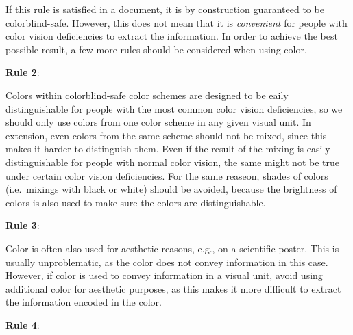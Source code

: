 \documentclass{scrartcl}
\begin{document}
If this rule is satisfied in a document, it is by construction guaranteed to be colorblind-safe.
However, this does not mean that it is \emph{convenient} for people with color vision deficiencies to extract the information.
In order to achieve the best possible result, a few more rules should be considered when using color.
\begin{center}
    \setlength{\fboxrule}{1pt}
    \textbf{Rule 2}:
\end{center}

Colors within colorblind-safe color schemes are designed to be eaily distinguishable for people with the most common color vision deficiencies, so we should only use colors from one color scheme in any given visual unit.
In extension, even colors from the same scheme should not be mixed, since this makes it harder to distinguish them.
Even if the result of the mixing is easily distinguishable for people with normal color vision, the same might not be true under certain color vision deficiencies.
For the same reaseon, shades of colors (i.e.\ mixings with black or white) should be avoided, because the brightness of colors is also used to make sure the colors are distinguishable.

\begin{center}
    \setlength{\fboxrule}{1pt}
    \textbf{Rule 3}:
\end{center}

Color is often also used for aesthetic reasons, e.g., on a scientific poster.
This is usually unproblematic, as the color does not convey information in this case.
However, if color is used to convey information in a visual unit, avoid using additional color for aesthetic purposes, as this makes it more difficult to extract the information encoded in the color.

\begin{center}
    \setlength{\fboxrule}{1pt}
    \textbf{Rule 4}:
\end{center}
\end{document}
